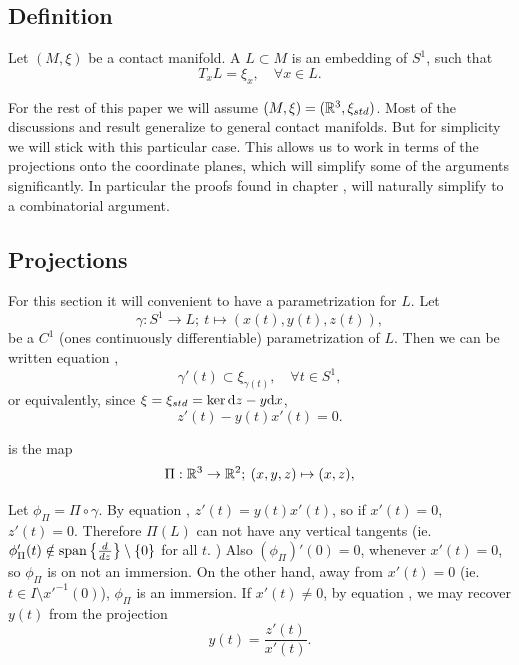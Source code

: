 
\subsection{Definition}


\begin{defn}
Let $(M,\xi)$ be a contact manifold. A  $L \subset M$ is
an embedding of $S^1$, such that 
\begin{equation}
\label{eq:l_knot_eq}
T_x L = \xi_x, \quad \forall x\in L. 
\end{equation}
\end{defn}

For the rest of this paper we will assume $(M,\xi) = (\mathbb{R}^3,\xi_{std})$. Most of
the discussions and result generalize to general contact manifolds. But for
simplicity we will stick with this particular case. This allows us to work in
terms of the projections onto the coordinate planes, which will simplify some of
the arguments significantly. In particular the proofs found in chapter
, will naturally simplify to a combinatorial argument.

\subsection{Projections}

For this section it will convenient to have a parametrization for $L$. Let
\[ \gamma : S^1 \to L; \: t \mapsto (x(t), y(t),z(t)), \] 
be a $C^1$ (ones continuously differentiable) parametrization of $L$. Then we 
can be written equation ,
\[ \gamma'(t) \subset \xi_{\gamma(t)}, \quad \forall t\in S^1, \] 
or equivalently, since $\xi = \xi_{std} = \operatorname{ker}{\mathrm{d} z - y\mathrm{d} x}$, 
\begin{equation}
\label{eq:std_l_knot_eq}
z'(t) - y(t) x'(t) = 0.
\end{equation}

\begin{defn}
 is the map
\[ \Pi : \mathbb{R}^3 \to \mathbb{R}^2; \: (x,y,z) \mapsto (x,z), \]
\end{defn}

Let $\phi_\Pi = \Pi \circ \gamma$.  By equation , $z'(t)
= y(t) x'(t)$, so if $x'(t) = 0$, $z'(t) = 0$. Therefore $\Pi(L)$ can not have
any vertical tangents \big(ie.  $\phi_\Pi'(t) \notin \operatorname{span}\qty{ \ensuremath{\frac{d^{} {}}{d {z}^{}}}}
\setminus\{0\}$ for all $t$. \big) Also $(\phi_\Pi)'(0) = 0$, whenever $x'(t) =
0$, so $\phi_\Pi$ is on not an immersion. On the other hand, away from $x'(t) =
0$ (ie. $t \in I \setminus x'^{-1}(0)$), $\phi_\Pi$ is an immersion.  If $x'(t)
\ne 0$, by equation , we may recover $y(t)$ from the
projection
\[ y(t) = \frac{z'(t)}{x'(t)}. \]

